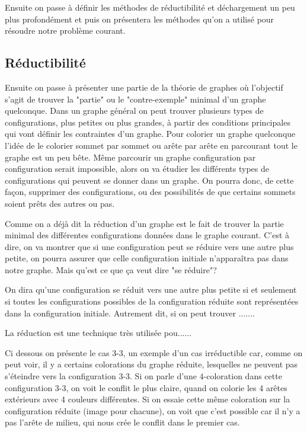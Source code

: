 \documentclass[10pt,a4paper]{article}
\begin{document}
Ensuite on passe à définir les méthodes de réductibilité et déchargement un peu plus profondément et puis on présentera les méthodes qu'on a utilisé pour résoudre notre problème courant. 

\subsection{Réductibilité}

Ensuite on passe à présenter une partie de la théorie de graphes où l'objectif s'agit de trouver la "partie" ou le "contre-exemple" minimal d'un graphe quelconque. Dans un graphe général on peut trouver plusieurs types de configurations, plus petites ou plus grandes, à partir des conditions principales qui vont définir les contraintes d'un graphe. Pour colorier un graphe quelconque l'idée de le colorier sommet par sommet ou arête par arête en parcourant tout le graphe est un peu bête. Même parcourir un graphe configuration par configuration serait impossible, alors on va étudier les différents types de configurations qui peuvent se donner dans un graphe. On pourra donc, de cette façon, supprimer des configurations, ou des possibilités de que certains sommets soient prêts des autres ou pas.

Comme on a déjà dit la réduction d'un graphe est le fait de trouver la partie minimal des différentes configurations données dans le graphe courant. C'est à dire, on va montrer que si une configuration peut se réduire vers une autre plus petite, on pourra assurer que celle configuration initiale n'apparaîtra pas dans notre graphe. Mais qu'est ce que ça veut dire "se réduire"?

On dira qu'une configuration se réduit vers une autre plus petite si et seulement si toutes les configurations possibles de la configuration réduite sont représentées dans la configuration initiale. Autrement dit, si on peut trouver .......

La réduction est une technique très utilisée pou...... 

Ci dessous on présente le cas 3-3, un exemple d'un cas irréductible car, comme on peut voir, il y a certains colorations du graphe réduite, lesquelles ne peuvent pas s'éteindre vers la configuration 3-3. Si on parle d'une $4$-coloration dans cette configuration 3-3, on voit le conflit le plus claire, quand on colorie les 4 arêtes extérieurs avec 4 couleurs différentes. Si on essaie cette même coloration sur la configuration réduite (image pour chacune), on voit que c'est possible car il n'y a pas l'arête de milieu, qui nous crée le conflit dans le premier cas. 
\end{document}
